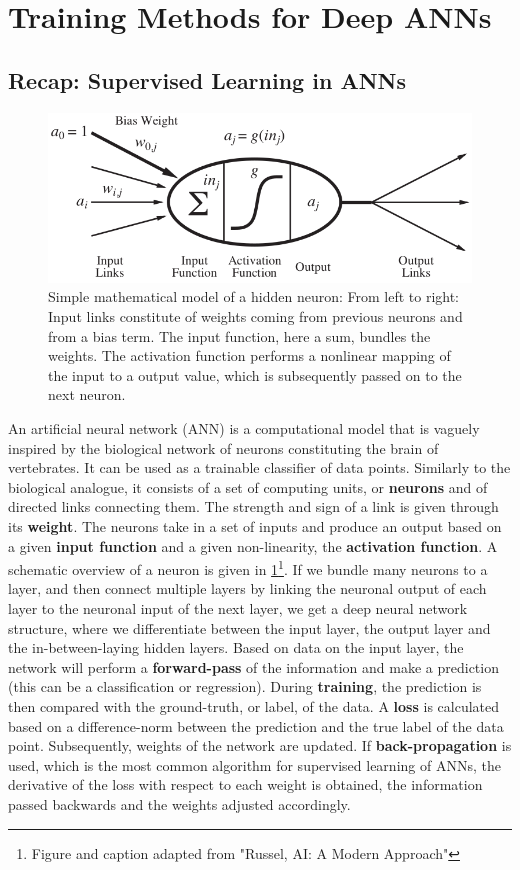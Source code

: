\documentclass[main]{subfiles}
\begin{document}
\newpage
\section{Training Methods for Deep ANNs}
\subsection{Recap: Supervised Learning in ANNs}

\begin{figure}[H]
		\centering
		\includegraphics[width=0.8\linewidth]{02_TrainingMethodsForDeepANNs/figures/neuron.png}
		\caption{Simple mathematical model of a hidden neuron: From left to right: Input links constitute of weights coming from previous neurons and from a bias term. The input function, here a sum, bundles the weights. The activation function performs a nonlinear mapping of the input to a output value, which is subsequently passed on to the next neuron.}
		\label{fig:neuron}
	\end{figure}
	
	An artificial neural network (ANN) is a computational model that is vaguely inspired by the biological network of neurons constituting the brain of vertebrates. It can be used as a trainable classifier of data points. Similarly to the biological analogue, it consists of a set of computing units, or \textbf{neurons} and of directed links connecting them. The strength and sign of a link is given through its \textbf{weight}. The neurons take in a set of inputs and produce an output based on a given \textbf{input function} and a given non-linearity, the \textbf{activation function}. A schematic overview of a neuron is given in \cref{fig:neuron}\footnote{Figure and caption adapted from "Russel, AI: A Modern Approach"}. If we bundle many neurons to a layer, and then connect multiple layers by linking the neuronal output of each layer to the neuronal input of the next layer, we get a deep neural network structure, where we differentiate between the input layer, the output layer and the in-between-laying hidden layers. Based on data on the input layer, the network will perform a \textbf{forward-pass} of the information and make a prediction (this can be a classification or regression). During \textbf{training}, the prediction is then compared with the ground-truth, or label, of the data. A \textbf{loss} is calculated based on a difference-norm between the prediction and the true label of the data point. Subsequently, weights of the network are updated. If \textbf{back-propagation} is used, which is the most common algorithm for supervised learning of ANNs, the derivative of the loss with respect to each weight is obtained, the information passed backwards and the weights adjusted accordingly. 
	
\end{document}
